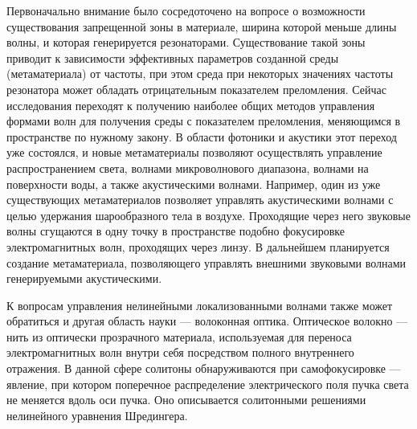 Первоначально внимание было сосредоточено на вопросе о возможности существования запрещенной зоны в материале, ширина которой меньше длины волны, и которая генерируется резонаторами. Существование такой зоны приводит к зависимости эффективных параметров созданной среды (метаматериала) от частоты, при этом среда при некоторых значениях частоты резонатора может обладать отрицательным показателем преломления. Сейчас исследования переходят к получению наиболее общих методов управления формами волн для получения среды с показателем преломления, меняющимся в пространстве по нужному закону. В области фотоники и акустики этот переход уже состоялся, и новые метаматериалы позволяют осуществлять управление распространением света, волнами микроволнового диапазона, волнами на поверхности воды, а также акустическими волнами. 
Например, один из уже существующих метаматериалов позволяет управлять акустическими волнами с целью удержания шарообразного тела в воздухе. Проходящие через него звуковые волны сгущаются в одну точку в пространстве подобно фокусировке электромагнитных волн, проходящих через линзу. В дальнейшем планируется создание метаматериала, позволяющего управлять внешними звуковыми волнами генерируемыми акустическими.


К вопросам управления нелинейными локализованными волнами также может обратиться и другая область науки --- волоконная оптика. Оптическое волокно --- нить из оптически прозрачного материала, используемая для переноса электромагнитных волн внутри себя посредством полного внутреннего отражения. В данной сфере солитоны обнаруживаются при самофокусировке --- явление, при котором поперечное распределение электрического поля пучка света не меняется вдоль оси пучка. Оно описывается солитонными решениями нелинейного уравнения Шредингера. 

